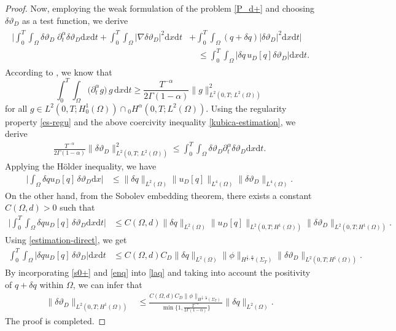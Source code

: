 \documentclass[a4paper,12pt,reqno,natbib]{amsart}
\newcommand{\dx} {\displaystyle\mathrm{d}x}
\newcommand{\dt} {\displaystyle\mathrm{d}t}
\begin{document}
\begin{proof}
Now, employing the weak formulation of the problem \eqref{P_d+} and choosing $\delta \vartheta_{D}$ as a test function, we derive
\begin{align} \label{laq}
\begin{split}
\Big|\int_0^T\int_{\Omega}\delta \vartheta_{D}\;\partial_t^\alpha \delta \vartheta_{D}\dx\dt+\int_0^T\int_{\Omega}\Big|\nabla \delta \vartheta_{D}\Big|^2\dx\dt&+\int_0^T\int_{\Omega}(q+\delta q)  \Big|\delta \vartheta_{D}\Big|^2 \dx \dt\Big|\\
&\quad\leq \int_0^T\int_{\Omega}\Big|\delta q \,u_D[q] \delta \vartheta_{D}\Big| \dx \dt.
\end{split}
\end{align}
According to \cite[Theorem 3.3]{kubica2020time}, we know that
\begin{equation}\label{kubica-estimation}
    \int_0^T\int_\Omega\Big(\partial_t^\alpha g\Big)\, g\,\dx\dt\geq \frac{T^{-\alpha}}{2\Gamma(1-\alpha)}\|g \|^2_{L^2(0,T;\, L^2(\Omega))}
\end{equation}
for all $g\in L^2(0,T;H^1_0(\Omega))\cap {}_0H^\alpha(0,T;L^2(\Omega)).$
Using the regularity property \eqref{es-regu} and the above coercivity inequality \eqref{kubica-estimation}, we derive
\begin{align}\label{enq}
\frac{T^{-\alpha}}{2\Gamma(1-\alpha)}\|\delta \vartheta_{D} \|^2_{L^2(0,T;\, L^2(\Omega))}\leq\int_0^T\int_\Omega \delta \vartheta_{D} \partial_{t}^\alpha\delta \vartheta_{D}\dx\dt.
\end{align}
Applying the H\"older inequality, we have
\begin{align*} 
\Big|\int_\Omega\delta q u_D[q]\, \delta \vartheta_{D}\dx\Big|&\leq
\|\delta q\|_{L^2(\Omega)}\| u_D[q]\|_{L^4(\Omega)}\|\delta \vartheta_{D}\|_{L^4(\Omega)}.
\end{align*}
On the other hand, from the Sobolev embedding theorem, there exists a constant $C(\Omega,d)>0$ such that
\begin{align} \label{h1++}
\Big|\int_0^T\int_\Omega\delta q u_D[q]\, \delta \vartheta_{D}\dx\dt\Big|&\leq C(\Omega,d)
\|\delta q\|_{L^2(\Omega)}\| u_D[q]\|_{L^2(0,T;H^1(\Omega))}\|\delta \vartheta_{D}\|_{L^2(0,T;H^1(\Omega))}.
\end{align}
Using \eqref{estimation-direct}, we get
\begin{align} \label{s0+}
\int_0^T\int_\Omega\Big|\delta q u_D[q]\, \delta \vartheta_{D}\Big|\dx\dt&\leq C(\Omega,d)C_D
\|\delta q\|_{L^2(\Omega)}\|\phi\|_{H^{\frac{1}{2}, \frac{\alpha}{4} }(\Sigma_T)}\|\delta \vartheta_{D}\|_{L^2(0,T;H^1(\Omega))}.
\end{align}
By incorporating \eqref{s0+} and \eqref{enq} into \eqref{laq} and taking into account the positivity of $q+\delta q$ within $\Omega$, we can infer that
\begin{align*}
    \|\delta \vartheta_{D}\|_{L^2(0,T;H^1(\Omega))}&\leq \frac{ C(\Omega,d)C_D\|\phi\|_{H^{\frac{1}{2}, \frac{\alpha}{4} }(\Sigma_T)}}{\min\{1,\frac{T^{-\alpha}}{2\Gamma(1-\alpha)}\}}
\|\delta q\|_{L^2(\Omega)}.
\end{align*}
The proof is completed.
\end{proof}
\end{document}
